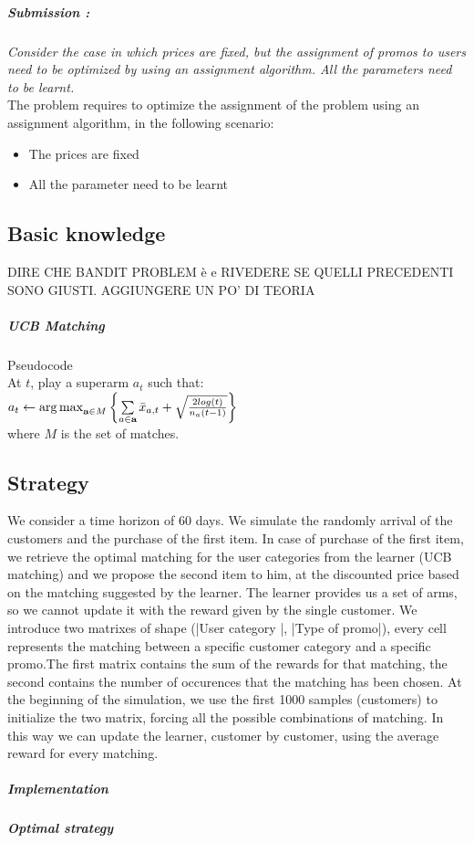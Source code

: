 \subparagraph*{Submission : }
\textit{Consider the case in which prices are fixed, but the assignment of promos to users need to be optimized by using an assignment algorithm. All the parameters need to be learnt.}\\

The problem requires to optimize the assignment of the problem using an assignment algorithm, in the following scenario:
\begin{itemize}
	\item The prices are fixed
	\item All the parameter need to be learnt
\end{itemize}

\subsection*{Basic knowledge}
DIRE CHE BANDIT PROBLEM è e RIVEDERE SE QUELLI PRECEDENTI SONO GIUSTI. AGGIUNGERE UN PO' DI TEORIA
\subparagraph*{UCB Matching}
Pseudocode\\
At $t$, play a superarm $a_{t}$ such that:\\
$a_{t} \leftarrow \operatorname{arg\,max}\limits_{\textbf{a} \in M}{\left\{\sum\limits_{a \in \textbf{a}}\bar{x}_{a,t} + \sqrt{\frac{2 log(t)}{{n_{a}(t-1)}} }\right\}}$ \\
where $M$ is the set of matches.

\subsection*{Strategy}

We consider a time horizon of 60 days. We simulate the randomly arrival of the customers and the purchase of the first item. In case of purchase of the first item, we retrieve the optimal matching for the user categories from the learner (UCB matching) and we propose the second item to him, at the discounted price based on the matching suggested by the learner. The learner provides us a set of arms, so we cannot update it with the reward given by the single customer. We introduce two matrixes of shape (|User category |, |Type of promo|), every cell represents the matching between a specific customer category and a specific promo.The first matrix contains the sum of the rewards for that matching, the second contains the number of occurences that the matching has been chosen. At the beginning of the simulation, we use the first 1000 samples (customers) to initialize the two matrix, forcing all the possible combinations of matching. In this way we can update the learner, customer by customer, using the average reward for every matching.
\subparagraph{Implementation} 
\subparagraph{Optimal strategy}


